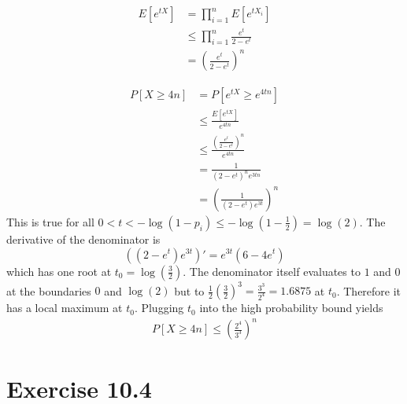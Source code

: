 \documentclass[10pt,a4paper]{article}
\begin{document}
\begin{align*}
  E[e^{tX}] & = \prod_{i = 1}^{n} E[e^{tX_{i}}]\\
            & \le \prod_{i = 1}^{n} \frac{e^{t}}{2 - e^{t}}\\
            & = \left(\frac{e^{t}}{2 - e^{t}}\right)^{n}
\end{align*}

\begin{align*}
  P[X \ge 4n] & = P[e^{tX} \ge e^{4tn}]\\
              & \le \frac{E[e^{tX}]}{e^{4tn}}\\
              & \le \frac{\left(\frac{e^{t}}{2 - e^{t}}\right)^{n}}{e^{4tn}}\\
              & = \frac{1}{(2 - e^{t})^{n}e^{3tn}}\\
              & = \left(\frac{1}{(2 - e^{t})e^{3t}}\right)^{n}
\end{align*}
This is true for all $0 < t < -\log(1 - p_{i}) \le -\log\left( 1 - \frac{1}{2} \right) = \log(2)$.
The derivative of the denominator is
\begin{equation*}
  \left( (2 - e^{t})e^{3t} \right)' = e^{3t}(6 - 4e^{t})
\end{equation*}
which has one root at $t_{0} = \log(\frac{3}{2})$.
The denominator itself evaluates to $1$ and $0$ at the boundaries $0$ and $\log(2)$ but to $\frac{1}{2}\left( \frac{3}{2} \right)^{3} = \frac{3^{3}}{2^{4}} = 1.6875$ at $t_{0}$.
Therefore it has a local maximum at $t_{0}$.
Plugging $t_{0}$ into the high probability bound yields
\begin{align*}
  P[X \ge 4n] \le \left( \frac{2^{4}}{3^{3}} \right)^{n}
\end{align*}

\section*{Exercise 10.4}
\end{document}
